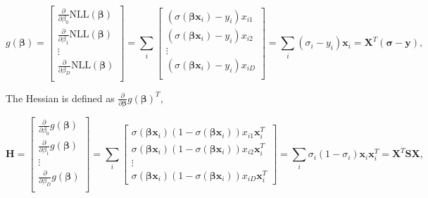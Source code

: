 \documentclass[11pt]{amsart}
\begin{document}
$$g(\boldsymbol\beta) = \begin{bmatrix}
\frac{\partial}{\partial \beta_0} \text{NLL}(\boldsymbol\beta) \\
\frac{\partial}{\partial \beta_1} \text{NLL}(\boldsymbol\beta) \\
\vdots \\
\frac{\partial}{\partial \beta_D} \text{NLL}(\boldsymbol\beta) \\
\end{bmatrix} =
\sum_i \begin{bmatrix}
(\sigma(\boldsymbol\beta\mathbf{x}_i) - y_i)x_{i1} \\
(\sigma(\boldsymbol\beta\mathbf{x}_i) - y_i)x_{i2} \\
\vdots \\
(\sigma(\boldsymbol\beta\mathbf{x}_i) - y_i)x_{iD} \\
\end{bmatrix}
= \sum_i (\sigma_i - y_i)\mathbf{x}_i = \mathbf{X}^T(\boldsymbol\sigma - \mathbf{y}),
$$

The Hessian is defined as $\frac{\partial}{\partial\mathbf{\boldsymbol\beta}}g(\boldsymbol\beta)^T$,

$$\mathbf{H} = \begin{bmatrix}
\frac{\partial}{\partial \beta_0} g(\boldsymbol\beta) \\
\frac{\partial}{\partial \beta_1} g(\boldsymbol\beta) \\
\vdots \\
\frac{\partial}{\partial \beta_D} g(\boldsymbol\beta) \\
\end{bmatrix} =
\sum_i\begin{bmatrix}
\sigma(\boldsymbol\beta\mathbf{x}_i)(1 - \sigma(\boldsymbol\beta\mathbf{x}_i))x_{i1}\mathbf{x}_i^T \\
\sigma(\boldsymbol\beta\mathbf{x}_i)(1 - \sigma(\boldsymbol\beta\mathbf{x}_i))x_{i2}\mathbf{x}_i^T \\
\vdots \\
\sigma(\boldsymbol\beta\mathbf{x}_i)(1 - \sigma(\boldsymbol\beta\mathbf{x}_i))x_{iD}\mathbf{x}_i^T
\end{bmatrix}
= \sum_i \sigma_i(1 - \sigma_i)\mathbf{x}_i\mathbf{x}_i^T = \mathbf{X}^T\mathbf{S}\mathbf{X},
$$
\end{document}
